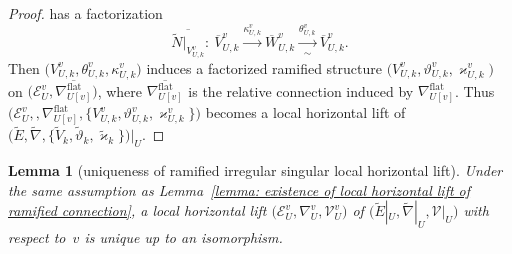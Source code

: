 \documentclass[pdftex]{sigma}
\numberwithin{equation}{section}
\newtheorem{Lemma}[Theorem]{Lemma}
\begin{document}
\begin{proof}
has a factorization
\[
 \overline { \tilde{N}|_{V^v_{U,k}} }
 \colon \
 \overline{V}^v_{U,k} \xrightarrow{\kappa^v_{U,k}}
 \overline{W}^v_{U,k} \xrightarrow[\sim]{\theta^v_{U,k}}
 \overline{V}^v_{U,k}.
\]
Then $\big(V^v_{U,k},\theta^v_{U,k},\kappa^v_{U,k}\big)$
induces a factorized ramified structure
$\big(V^v_{U,k},\vartheta^v_{U,k},\varkappa^v_{U,k}\big)$
on $\big({\mathcal E}^v_U,\overline{\nabla^{\mathrm{flat}}_{U[v]}}\big)$,
where $\overline{\nabla^{\mathrm{flat}}_{U[v]}}$
is the relative connection induced by
$\nabla^{\mathrm{flat}}_{U[v]}$.
Thus
$\big(
{\mathcal E}^v_U ,,
\nabla^{\mathrm{flat}}_{U[v]} ,
\big\{
V^v_{U,k},\vartheta^v_{U,k},\varkappa^v_{U,k} \big\} \big)$
becomes a local horizontal lift of
$\big(\tilde{E},\tilde{\nabla},\{\tilde{V}_{k},
\tilde{\vartheta}_{k},\tilde{\varkappa}_{k}\}\big)
\big|_U$.
\end{proof}

\begin{Lemma}[uniqueness of ramified irregular singular local horizontal lift]\label{lemma: uniqueness of ramified local horizontal lift}
Under the same assumption as
Lemma~{\rm \ref{lemma: existence of local horizontal lift of ramified connection}},
a local horizontal lift
$\big({\mathcal E}^v_U,\nabla^v_U, {\mathcal V}^v_U\big)$
of
$\big(\tilde{E}|_U,\tilde{\nabla}|_U,{\mathcal V}|_U\big)$
with respect to~$v$
is unique up to an isomorphism.
\end{Lemma}
\end{document}
